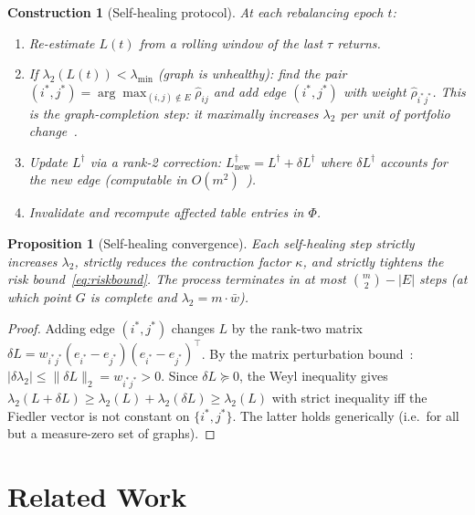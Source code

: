 \documentclass[twocolumn,11pt,a4paper]{article}
\newtheorem{proposition}[theorem]{Proposition}
\newtheorem{construction}[theorem]{Construction}
\theoremstyle{remark}
\newcommand{\Ld}{L^\dagger}
\newcommand{\lam}[1]{\lambda_{#1}}
\newcommand{\kap}{\kappa}
\begin{document}
\begin{construction}[Self-healing protocol]
At each rebalancing epoch $t$:
\begin{enumerate}[leftmargin=*, label=\arabic*.]
\item Re-estimate $L(t)$ from a rolling window of the last $\tau$ returns.
\item If $\lam{2}(L(t)) < \lambda_{\min}$ (graph is unhealthy):
  find the pair $(i^*,j^*) = \arg\max_{(i,j)\notin E}\hat\rho_{ij}$ and
  add edge $(i^*,j^*)$ with weight $\hat\rho_{i^*j^*}$.
  This is the \emph{graph-completion step}: it maximally increases
  $\lam{2}$ per unit of portfolio change~\cite{ghosh2006}.
\item Update $\Ld$ via a rank-2 correction:
  $\Ld_{\text{new}} = \Ld + \delta\Ld$ where $\delta\Ld$ accounts for the new edge
  (computable in $O(m^2)$~\cite{golub1996}).
\item Invalidate and recompute affected table entries in $\Phi$.
\end{enumerate}
\end{construction}

\begin{proposition}[Self-healing convergence]
Each self-healing step strictly increases $\lam{2}$, strictly reduces
the contraction factor $\kap$, and strictly tightens the risk bound~\eqref{eq:riskbound}.
The process terminates in at most $\binom{m}{2} - |E|$ steps
(at which point $G$ is complete and $\lam{2} = m\cdot\bar w$).
\end{proposition}

\begin{proof}
Adding edge $(i^*,j^*)$ changes $L$ by the rank-two matrix
$\delta L = w_{i^*j^*}(e_{i^*}-e_{j^*})(e_{i^*}-e_{j^*})^\top$.
By the matrix perturbation bound~\cite{bhatia1997}:
$|\delta\lam{2}| \leq \|\delta L\|_2 = w_{i^*j^*} > 0$.
Since $\delta L \succeq 0$, the Weyl inequality gives
$\lam{2}(L+\delta L) \geq \lam{2}(L) + \lam{2}(\delta L) \geq \lam{2}(L)$
with strict inequality iff the Fiedler vector is not constant on $\{i^*,j^*\}$.
The latter holds generically (i.e.\ for all but a measure-zero set of graphs).
\end{proof}


\section{Related Work}
\label{sec:related}
\end{document}
